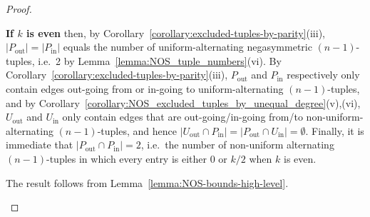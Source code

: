 \documentclass[10pt,a4paper]{amsart}
\begin{document}
\begin{proof}
\begin{itemize}
    {\bf If $k$ is even} then, by Corollary~\ref{corollary:excluded-tuples-by-parity}(iii),
    $|P_{\text{out}}|=|P_{\text{in}}|$ equals the number of uniform-alternating negasymmetric
    $(n-1)$-tuples, i.e.\ 2 by Lemma~\ref{lemma:NOS_tuple_numbers}(vi).
     \newline By Corollary~\ref{corollary:excluded-tuples-by-parity}(iii), $P_{\text{out}}$
    and $P_{\text{in}}$ respectively only contain edges out-going from or in-going to
    uniform-alternating $(n-1)$-tuples, and by
    Corollary~\ref{corollary:NOS_excluded_tuples_by_unequal_degree}(v),(vi), $U_{\text{out}}$
    and $U_{\text{in}}$ only contain edges that are out-going/in-going from/to
    non-uniform-alternating $(n-1)$-tuples, and hence $|U_{\text{out}}\cap
    P_{\text{in}}|=|P_{\text{out}}\cap U_{\text{in}}|=\emptyset$.
     \newline Finally, it is immediate that $|P_{\text{out}}\cap P_{\text{in}}|=2$,
    i.e.\ the number of non-uniform alternating $(n-1)$-tuples in which every entry is either 0
    or $k/2$ when $k$ is even.

    The result follows from Lemma~\ref{lemma:NOS-bounds-high-level}.

\end{itemize}
\end{proof}
\end{document}
